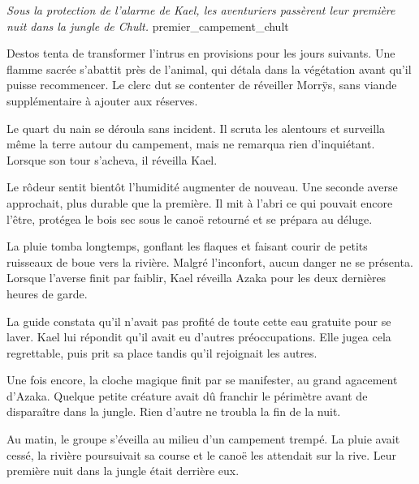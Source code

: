 {\textit{Sous la protection de l’alarme de Kael, les aventuriers passèrent leur première nuit dans la jungle de Chult.}}
{premier_campement_chult}

Destos tenta de transformer l'intrus en provisions pour les jours suivants. Une flamme sacrée s'abattit près de l'animal, qui détala dans la végétation avant qu'il puisse recommencer. Le clerc dut se contenter de réveiller Morrÿs, sans viande supplémentaire à ajouter aux réserves.

Le quart du nain se déroula sans incident. Il scruta les alentours et surveilla même la terre autour du campement, mais ne remarqua rien d'inquiétant. Lorsque son tour s'acheva, il réveilla Kael.

Le rôdeur sentit bientôt l'humidité augmenter de nouveau. Une seconde averse approchait, plus durable que la première. Il mit à l'abri ce qui pouvait encore l'être, protégea le bois sec sous le canoë retourné et se prépara au déluge.

La pluie tomba longtemps, gonflant les flaques et faisant courir de petits ruisseaux de boue vers la rivière. Malgré l'inconfort, aucun danger ne se présenta. Lorsque l'averse finit par faiblir, Kael réveilla Azaka pour les deux dernières heures de garde.

La guide constata qu'il n'avait pas profité de toute cette eau gratuite pour se laver. Kael lui répondit qu'il avait eu d'autres préoccupations. Elle jugea cela regrettable, puis prit sa place tandis qu'il rejoignait les autres.

Une fois encore, la cloche magique finit par se manifester, au grand agacement d'Azaka. Quelque petite créature avait dû franchir le périmètre avant de disparaître dans la jungle. Rien d'autre ne troubla la fin de la nuit.

Au matin, le groupe s'éveilla au milieu d'un campement trempé. La pluie avait cessé, la rivière poursuivait sa course et le canoë les attendait sur la rive. Leur première nuit dans la jungle était derrière eux.
